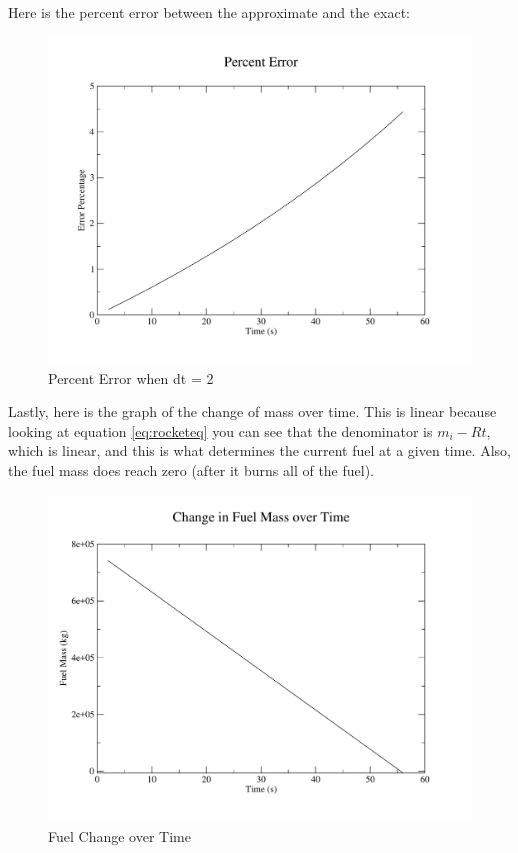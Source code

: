 \documentclass[11pt]{article}
\begin{document}
\newpage
Here is the percent error between the approximate and the exact:
\begin{figure}[H]
\centering
\includegraphics[scale=0.45]{error.pdf}
\caption{Percent Error when dt = 2}
\end{figure}
Lastly, here is the graph of the change of mass over time. This is linear because looking at equation \eqref{eq:rocketeq} you can see that the denominator is $m_i - Rt$, which is linear, and this is what determines the current fuel at a given time. Also, the fuel mass does reach zero (after it burns all of the fuel).

\begin{figure}[H]
\centering
\includegraphics[scale=0.45]{fuelMassChange.pdf}
\caption{Fuel Change over Time}
\end{figure}
\end{document}
